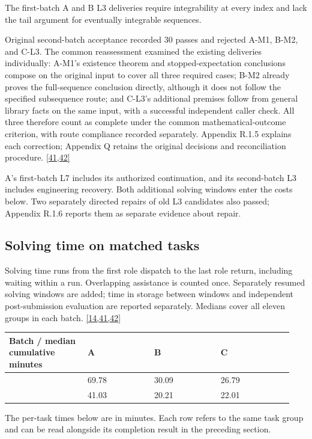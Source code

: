 The first-batch A and B L3 deliveries require integrability at every index and lack the tail argument for eventually integrable sequences.

Original second-batch acceptance recorded 30 passes and rejected A-M1, B-M2, and C-L3. The common reassessment examined the existing deliveries individually: A-M1's existence theorem and stopped-expectation conclusions compose on the original input to cover all three required cases; B-M2 already proves the full-sequence conclusion directly, although it does not follow the specified subsequence route; and C-L3's additional premises follow from general library facts on the same input, with a successful independent caller check. All three therefore count as complete under the common mathematical-outcome criterion, with route compliance recorded separately. Appendix R.1.5 explains each correction; Appendix Q retains the original decisions and reconciliation procedure. \hyperlink{ref-41}{\mbox{[41,42]}}

A's first-batch L7 includes its authorized continuation, and its second-batch L3 includes engineering recovery. Both additional solving windows enter the costs below. Two separately directed repairs of old L3 candidates also passed; Appendix R.1.6 reports them as separate evidence about repair.

\subsection[Solving time on matched tasks]{\texorpdfstring{\protect\hypertarget{section-3-2}{}Solving time on matched tasks}{Solving time on matched tasks}}
Solving time runs from the first role dispatch to the last role return, including waiting within a run. Overlapping assistance is counted once. Separately resumed solving windows are added; time in storage between windows and independent post-submission evaluation are reported separately. Medians cover all eleven groups in each batch. \hyperlink{ref-14}{\mbox{[14,41,42]}}

\begingroup\small\setlength{\tabcolsep}{3pt}\renewcommand{\arraystretch}{1.14}
\par\nopagebreak\medskip\noindent\begin{minipage}[t]{\linewidth}
\begin{tabular}{>{\raggedright\arraybackslash}p{0.26\linewidth}>{\raggedright\arraybackslash}p{0.22\linewidth}>{\raggedright\arraybackslash}p{0.22\linewidth}>{\raggedright\arraybackslash}p{0.24\linewidth}}
\toprule
\textbf{Batch / median cumulative minutes} & \textbf{A} & \textbf{B} & \textbf{C}\\\midrule

{1} & {69.78} & {30.09} & {26.79}\\
{2} & {41.03} & {20.21} & {22.01}\\
\bottomrule\end{tabular}\end{minipage}\par\medskip\endgroup
The per-task times below are in minutes. Each row refers to the same task group and can be read alongside its completion result in the preceding section.

